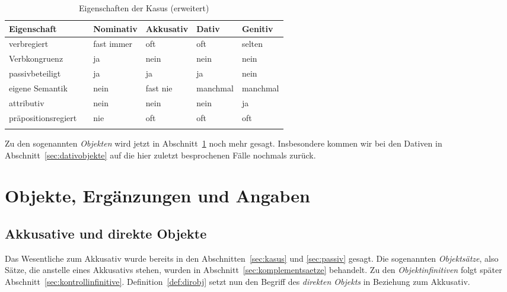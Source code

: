\begin{table}[!htbp]
  \begin{tabular}{lp{0.1cm}llll}
    \lsptoprule
     \textbf{Eigenschaft} && \textbf{Nominativ} & \textbf{Akkusativ} & \textbf{Dativ} & \textbf{Genitiv} \\
    \hline
    verbregiert && fast immer & oft & oft & selten \\
    Verbkongruenz && ja & nein & nein & nein \\
    passivbeteiligt && ja & ja & ja & nein \\
    eigene Semantik && nein & fast nie & manchmal & manchmal \\
    attributiv && nein & nein & nein & ja \\
    präpositionsregiert && nie & oft & oft & oft \\
    \lspbottomrule
  \end{tabular}
  \caption{Eigenschaften der Kasus (erweitert)}
  \label{tab:eigenschaftenderkasuserweitert}
\end{table}

Zu den sogenannten \textit{Objekten} wird jetzt in Abschnitt~\ref{sec:objekte} noch mehr gesagt.
Insbesondere kommen wir bei den Dativen in Abschnitt~\ref{sec:dativobjekte} auf die hier zuletzt besprochenen Fälle nochmals zurück.




\section{Objekte, Ergänzungen und Angaben}

\label{sec:objekte}

\subsection{Akkusative und direkte Objekte}


Das Wesentliche zum Akkusativ wurde bereits in den Abschnitten~\ref{sec:kasus} und \ref{sec:passiv} gesagt.
Die sogenannten \textit{Objektsätze}, also Sätze, die anstelle eines Akkusativs stehen, wurden in Abschnitt~\ref{sec:komplementsaetze} behandelt.
Zu den \textit{Objektinfinitiven} folgt später Abschnitt~\ref{sec:kontrollinfinitive}.
Definition~\ref{def:dirobj} setzt nun den Begriff des \textit{direkten Objekts} in Beziehung zum Akkusativ.

